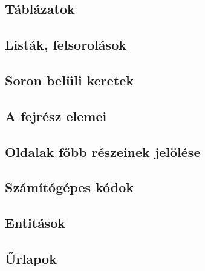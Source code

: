 \documentclass[usenames,dvipsnames,aspectratio=169]{beamer}
\begin{document}
%

\subsection{Táblázatok}

%

\subsection{Listák, felsorolások}

%

\subsection{Soron belüli keretek}

%

\subsection{A fejrész elemei}

%

\subsection{Oldalak főbb részeinek jelölése}

%

\subsection{Számítógépes kódok}

%

\subsection{Entitások}

%

\subsection{Űrlapok}



\end{document}
